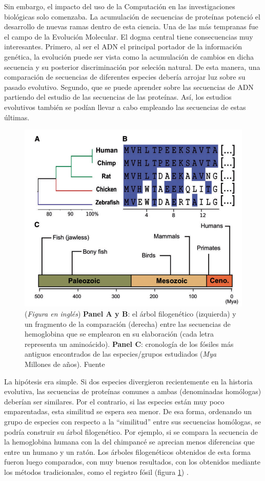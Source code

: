 Sin embargo, el impacto del uso de la Computación en las investigaciones biológicas solo comenzaba.
La acumulación de secuencias de proteínas potenció el desarrollo de nuevas ramas dentro de esta ciencia.
Una de las más tempranas fue el campo de la Evolución Molecular.
El dogma central tiene consecuencias muy interesantes.
Primero, al ser el ADN el principal portador de la información genética, la evolución puede ser vista como la acumulación de cambios en dicha secuencia y su posterior discriminación por seleción natural.
De esta manera, una comparación de secuencias de diferentes especies debería arrojar luz sobre su pasado evolutivo.
Segundo, que se puede aprender sobre las secuencias de ADN partiendo del estudio de las secuencias de las proteínas.
Así, los estudios evolutivos también se podían llevar a cabo empleando las secuencias de estas últimas.
 
\begin{figure}[h]
   \centering
   \includegraphics[width=0.7\columnwidth]{images/evolution.png}
   \caption{
       (\textit{Figura en inglés})
       \textbf{Panel A y B}: el árbol filogenético (izquierda) y un fragmento de la comparación (derecha) entre las secuencias de hemoglobina que se emplearon en su elaboración (cada letra representa un aminoácido).
       \textbf{Panel C}: cronología de los fósiles más antiguos encontrados de las especies/grupos estudiados (\textit{Mya} Millones de años).
       Fuente \cite{gauthierBriefHistoryBioinformatics2019}}
   \label{fig:evolution}
\end{figure}

La hipótesis era simple.
Si dos especies divergieron recientemente en la historia evolutiva, las secuencias de proteínas comunes a ambas (denominadas homólogas) deberían ser similares.
Por el contrario, si las especies están muy poco emparentadas, esta similitud se espera sea menor.
De esa forma, ordenando un grupo de especies con respecto a la ``similitud'' entre sus secuencias homólogas, se podría construir su árbol filogenético.
Por ejemplo, si se compara la secuencia de la hemoglobina humana con la del chimpancé se aprecian menos diferencias que entre un humano y un ratón.
Los árboles filogenéticos obtenidos de esta forma fueron luego comparados,  con muy buenos resultados, con los obtenidos mediante los métodos tradicionales, como el registro fósil (figura \ref{fig:evolution}) \cite{fitchConstructionPhylogeneticTrees1967}.

